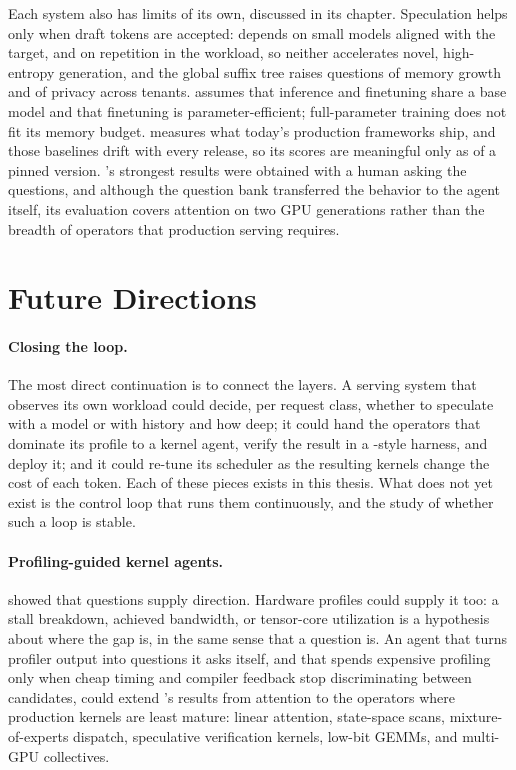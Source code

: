 Each system also has limits of its own, discussed in its chapter.
Speculation helps only when draft tokens are accepted: \SpecInfer depends on small models aligned with the target, and \SuffixDecoding on repetition in the workload, so neither accelerates novel, high-entropy generation, and the global suffix tree raises questions of memory growth and of privacy across tenants.
\FlexLLM assumes that inference and finetuning share a base model and that finetuning is parameter-efficient; full-parameter training does not fit its memory budget.
\FastKernels measures what today's production frameworks ship, and those baselines drift with every release, so its scores are meaningful only as of a pinned version.
\KernelSeek's strongest results were obtained with a human asking the questions, and although the question bank transferred the behavior to the agent itself, its evaluation covers attention on two GPU generations rather than the breadth of operators that production serving requires.

\section{Future Directions}
\label{conclusion:sec:future}

\paragraph{Closing the loop.}
The most direct continuation is to connect the layers.
A serving system that observes its own workload could decide, per request class, whether to speculate with a model or with history and how deep; it could hand the operators that dominate its profile to a kernel agent, verify the result in a \FastKernels-style harness, and deploy it; and it could re-tune its scheduler as the resulting kernels change the cost of each token.
Each of these pieces exists in this thesis.
What does not yet exist is the control loop that runs them continuously, and the study of whether such a loop is stable.

\paragraph{Profiling-guided kernel agents.}
\KernelSeek showed that questions supply direction.
Hardware profiles could supply it too: a stall breakdown, achieved bandwidth, or tensor-core utilization is a hypothesis about where the gap is, in the same sense that a question is.
An agent that turns profiler output into questions it asks itself, and that spends expensive profiling only when cheap timing and compiler feedback stop discriminating between candidates, could extend \KernelSeek's results from attention to the operators where production kernels are least mature: linear attention, state-space scans, mixture-of-experts dispatch, speculative verification kernels, low-bit GEMMs, and multi-GPU collectives.

